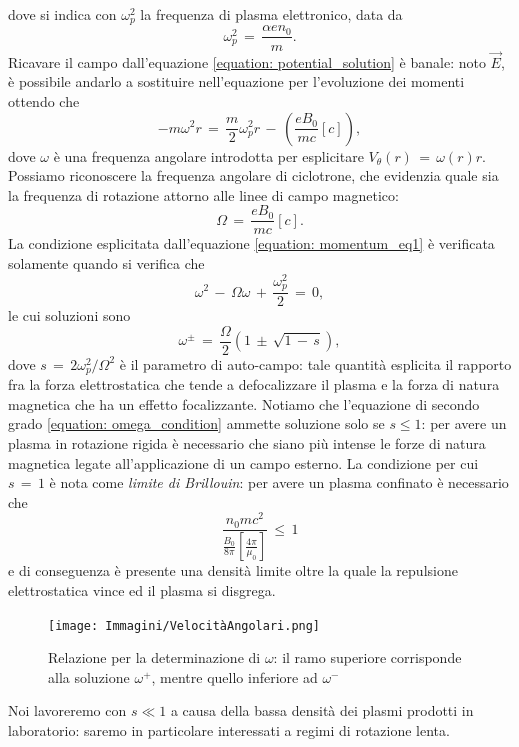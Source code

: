 dove si indica con $\omega_p^2$ la frequenza di plasma elettronico, data da
\begin{equation}
    \omega_p^2\,=\,\frac{\alpha e n_0}{m}.
    \label{equation: plasma_freq}
\end{equation}
Ricavare il campo dall'equazione \eqref{equation: potential_solution} è banale: noto $\vec{E}$, è possibile andarlo a sostituire nell'equazione 
per l'evoluzione dei momenti ottendo che
\begin{equation}
    -m\omega^2r\,=\,\frac{m}{2}\omega_p^2r\,-\,\left(\frac{eB_0}{mc}\left[c\right]\right),
    \label{equation: momentum_eq1}
\end{equation}
dove $\omega$ è una frequenza angolare introdotta per esplicitare $V_\theta\left(r\right)\,=\,\omega\left(r\right)r$. Possiamo
riconoscere la frequenza angolare di ciclotrone, che evidenzia quale sia la frequenza di rotazione attorno alle linee di campo
magnetico:
\begin{equation}
    \Omega\,=\,\frac{eB_0}{mc}\left[c\right].
    \label{equation: ciclotron_frequency}
\end{equation}
La condizione esplicitata dall'equazione \eqref{equation: momentum_eq1} è verificata solamente quando si verifica che
\begin{equation}
    \omega^2\,-\,\Omega\omega\,+\,\frac{\omega_p^2}{2}\,=\,0,
    \label{equation: omega_condition}
\end{equation}
le cui soluzioni sono
\begin{equation}
    \omega^\pm\,=\,\frac{\Omega}{2}\left(1\,\pm\,\sqrt{1\,-\,s}\right), 
    \label{equation: omega_solution}
\end{equation}
dove $s\,=\,2\omega_p^2/\Omega^2$ è il parametro di auto-campo: tale quantità esplicita il rapporto fra la forza elettrostatica
 che tende a defocalizzare il plasma e la forza di natura magnetica che ha un effetto focalizzante. Notiamo che l'equazione di 
secondo grado \eqref{equation: omega_condition} ammette soluzione solo se $s \leq 1$: per avere un plasma in rotazione rigida è
necessario che siano più intense le forze di natura magnetica legate all'applicazione di un campo esterno. La condizione per cui 
$s\,=\,1$ è nota come \textit{limite di Brillouin}: per avere un plasma confinato è necessario che
\begin{equation}
    \frac{n_0 mc^2}{\frac{B_0}{8\pi}\left[\frac{4\pi}{\mu_0}\right]}\,\leq\,1
    \label{equation: confinement_cond}
\end{equation}
e di conseguenza è presente una densità limite oltre la quale la repulsione elettrostatica vince ed il plasma si disgrega. 
\begin{figure}[H]
    \centering
    \texttt{[image: Immagini/VelocitàAngolari.png]}
    \caption{Relazione per la determinazione di $\omega$: il ramo superiore corrisponde alla soluzione $\omega^+$, mentre
    quello inferiore ad $\omega^-$}
    \label{figure: ProfDens}
\end{figure}
Noi lavoreremo con $s \ll 1$ a causa della bassa densità dei plasmi prodotti in laboratorio: saremo in particolare interessati 
a regimi di rotazione lenta.

